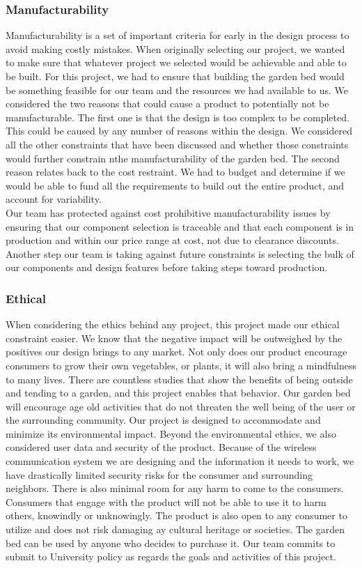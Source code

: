 \subsubsection{Manufacturability}
Manufacturability is a set of important criteria for early in the design process to avoid making costly mistakes. When originally selecting our project, we wanted to make sure that whatever project we selected would be achievable and able to be built. For this project, we had to ensure that building the garden bed would be something feasible for our team and the resources we had available to us. We considered the two reasons that could cause a product to potentially not be manufacturable. The first one is that the design is too complex to be completed. This could be caused by any number of reasons within the design. We considered all the other constraints that have been discussed and whether those constraints would further constrain nthe manufacturability of the garden bed. The second reason relates back to the cost restraint. We had to budget and determine if we would be able to fund all the requirements to build out the entire product, and account for variability. \\

Our team has protected against cost prohibitive manufacturability issues by ensuring that our component selection is traceable and that each component is in production and within our price range at cost, not due to clearance discounts. Another step our team is taking against future constraints is selecting the bulk of our components and design features before taking steps toward production.  

\subsubsection{Ethical}
When considering the ethics behind any project, this project made our ethical constraint easier. We know that the negative impact will be outweighed by the positives our design brings to any market. Not only does our product encourage consumers to grow their own vegetables, or plants, it will also bring a mindfulness to many lives. There are countless studies that show the benefits of being outside and tending to a garden, and this project enables that behavior. Our garden bed will encourage age old activities that do not threaten the well being of the user or the surrounding community. Our project is designed to accommodate and minimize its environmental impact. Beyond the environmental ethics, we also considered user data and security of the product. Because of the wireless communication system we are designing and the information it needs to work, we have drastically limited security risks for the consumer and surrounding neighbors. There is also minimal room for any harm to come to the consumers. Consumers that engage with the product will not be able to use it to harm others, knowindly or unknowingly. The product is also open to any consumer to utilize and does not risk damaging ay cultural heritage or societies. The garden bed can be used by anyone who decides to purchase it.  Our team commits to submit to University policy as regards the goals and activities of this project.

